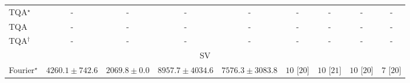 \begin{tabular}{l|cccc|cccc|}
TQA$^\star$ & {\cellcolor[HTML]{000000}} \color[HTML]{F1F1F1} {\cellcolor{white}} \color{black} - & {\cellcolor[HTML]{000000}} \color[HTML]{F1F1F1} {\cellcolor{white}} \color{black} - & {\cellcolor[HTML]{000000}} \color[HTML]{F1F1F1} {\cellcolor{white}} \color{black} - & {\cellcolor[HTML]{000000}} \color[HTML]{F1F1F1} {\cellcolor{white}} \color{black} - & {\cellcolor[HTML]{000000}} \color[HTML]{F1F1F1} {\cellcolor{white}} \color{black} - & {\cellcolor[HTML]{000000}} \color[HTML]{F1F1F1} {\cellcolor{white}} \color{black} - & {\cellcolor[HTML]{000000}} \color[HTML]{F1F1F1} {\cellcolor{white}} \color{black} - & {\cellcolor[HTML]{000000}} \color[HTML]{F1F1F1} {\cellcolor{white}} \color{black} - \\
TQA & {\cellcolor[HTML]{000000}} \color[HTML]{F1F1F1} {\cellcolor{white}} \color{black} - & {\cellcolor[HTML]{000000}} \color[HTML]{F1F1F1} {\cellcolor{white}} \color{black} - & {\cellcolor[HTML]{000000}} \color[HTML]{F1F1F1} {\cellcolor{white}} \color{black} - & {\cellcolor[HTML]{000000}} \color[HTML]{F1F1F1} {\cellcolor{white}} \color{black} - & {\cellcolor[HTML]{000000}} \color[HTML]{F1F1F1} {\cellcolor{white}} \color{black} - & {\cellcolor[HTML]{000000}} \color[HTML]{F1F1F1} {\cellcolor{white}} \color{black} - & {\cellcolor[HTML]{000000}} \color[HTML]{F1F1F1} {\cellcolor{white}} \color{black} - & {\cellcolor[HTML]{000000}} \color[HTML]{F1F1F1} {\cellcolor{white}} \color{black} - \\
TQA$^\dagger$ & {\cellcolor[HTML]{000000}} \color[HTML]{F1F1F1} {\cellcolor{white}} \color{black} - & {\cellcolor[HTML]{000000}} \color[HTML]{F1F1F1} {\cellcolor{white}} \color{black} - & {\cellcolor[HTML]{000000}} \color[HTML]{F1F1F1} {\cellcolor{white}} \color{black} - & {\cellcolor[HTML]{000000}} \color[HTML]{F1F1F1} {\cellcolor{white}} \color{black} - & {\cellcolor[HTML]{000000}} \color[HTML]{F1F1F1} {\cellcolor{white}} \color{black} - & {\cellcolor[HTML]{000000}} \color[HTML]{F1F1F1} {\cellcolor{white}} \color{black} - & {\cellcolor[HTML]{000000}} \color[HTML]{F1F1F1} {\cellcolor{white}} \color{black} - & {\cellcolor[HTML]{000000}} \color[HTML]{F1F1F1} {\cellcolor{white}} \color{black} - \\
\cline{1-9}
\multicolumn{9}{c}{\rule{0pt}{8pt}SV} \\
\midrule
Fourier$^\star$ & {\cellcolor[HTML]{A9BFDC}} \color[HTML]{000000} $4260.1\pm 742.6$ & {\cellcolor[HTML]{F5EEF6}} \color[HTML]{000000} $2069.8\pm 0.0$ & {\cellcolor[HTML]{023858}} \color[HTML]{F1F1F1} $8957.7\pm 4034.6$ & {\cellcolor[HTML]{04649E}} \color[HTML]{F1F1F1} $7576.3\pm 3083.8$ & {\cellcolor[HTML]{49006A}} \color[HTML]{F1F1F1} $10$ [$20$] & {\cellcolor[HTML]{49006A}} \color[HTML]{F1F1F1} $10$ [$21$] & {\cellcolor[HTML]{49006A}} \color[HTML]{F1F1F1} $10$ [$20$] & {\cellcolor[HTML]{CD238F}} \color[HTML]{F1F1F1} $7$ [$20$] \\

\end{tabular}
